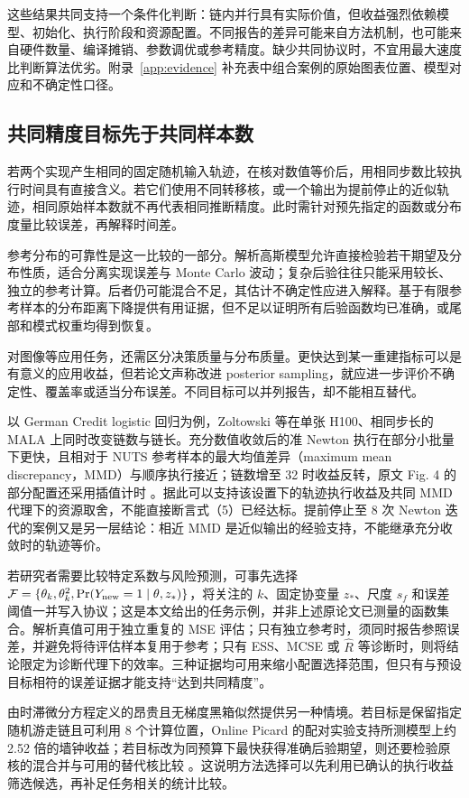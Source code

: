 \documentclass[UTF8,a4paper,zihao=-4,fontset=fandol]{ctexart}
\begin{document}
这些结果共同支持一个条件化判断：链内并行具有实际价值，但收益强烈依赖模型、初始化、执行阶段和资源配置。不同报告的差异可能来自方法机制，也可能来自硬件数量、编译摊销、参数调优或参考精度。缺少共同协议时，不宜用最大速度比判断算法优劣。附录~\ref{app:evidence} 补充表中组合案例的原始图表位置、模型对应和不确定性口径。

\subsection{共同精度目标先于共同样本数}

若两个实现产生相同的固定随机输入轨迹，在核对数值等价后，用相同步数比较执行时间具有直接含义。若它们使用不同转移核，或一个输出为提前停止的近似轨迹，相同原始样本数就不再代表相同推断精度。此时需针对预先指定的函数或分布度量比较误差，再解释时间差。

参考分布的可靠性是这一比较的一部分。解析高斯模型允许直接检验若干期望及分布性质，适合分离实现误差与 Monte Carlo 波动；复杂后验往往只能采用较长、独立的参考计算。后者仍可能混合不足，其估计不确定性应进入解释。基于有限参考样本的分布距离下降提供有用证据，但不足以证明所有后验函数均已准确，或尾部和模式权重均得到恢复。

对图像等应用任务，还需区分决策质量与分布质量。更快达到某一重建指标可以是有意义的应用收益，但若论文声称改进 posterior sampling，就应进一步评价不确定性、覆盖率或适当分布误差。不同目标可以并列报告，却不能相互替代。

以 German Credit logistic 回归为例，Zoltowski 等在单张 H100、相同步长的 MALA 上同时改变链数与链长。充分数值收敛后的准 Newton 执行在部分小批量下更快，且相对于 NUTS 参考样本的最大均值差异（maximum mean discrepancy，MMD）与顺序执行接近；链数增至 32 时收益反转，原文 Fig. 4 的部分配置还采用插值计时 \cite{zoltowski2025}。据此可以支持该设置下的轨迹执行收益及共同 MMD 代理下的资源取舍，不能直接断言式（5）已经达标。提前停止至 8 次 Newton 迭代的案例又是另一层结论：相近 MMD 是近似输出的经验支持，不能继承充分收敛时的轨迹等价。

若研究者需要比较特定系数与风险预测，可事先选择 $\mathcal F=\{\theta_k,\theta_k^2,\Pr(Y_{\rm new}=1\mid\theta,z_*)\}$，将关注的 $k$、固定协变量 $z_*$、尺度 $s_f$ 和误差阈值一并写入协议；这是本文给出的任务示例，并非上述原论文已测量的函数集合。解析真值可用于独立重复的 MSE 评估；只有独立参考时，须同时报告参照误差，并避免将待评估样本复用于参考；只有 ESS、MCSE 或 $\widehat R$ 等诊断时，则将结论限定为诊断代理下的效率。三种证据均可用来缩小配置选择范围，但只有与预设目标相符的误差证据才能支持“达到共同精度”。

由时滞微分方程定义的昂贵且无梯度黑箱似然提供另一种情境。若目标是保留指定随机游走链且可利用 8 个计算位置，Online Picard 的配对实验支持所测模型上约 2.52 倍的墙钟收益；若目标改为同预算下最快获得准确后验期望，则还要检验原核的混合并与可用的替代核比较 \cite{grazzi2026}。这说明方法选择可以先利用已确认的执行收益筛选候选，再补足任务相关的统计比较。
\end{document}
